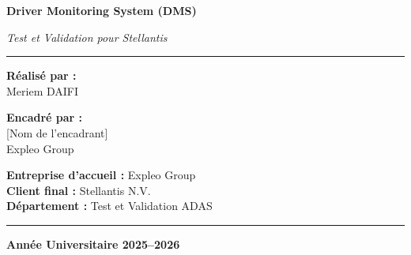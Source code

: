 \documentclass[12pt,a4paper,twoside]{report}
\begin{document}
\begin{titlepage}
\begin{center}
\vspace{0.3cm}

{\LARGE \textcolor{expleored}{\textbf{Driver Monitoring System (DMS)}}}

\vspace{0.3cm}

{\large \textit{Test et Validation pour Stellantis}}

\vspace{0.5cm}

\rule{0.8\textwidth}{0.5pt}

\vspace{1.2cm}

\begin{minipage}{0.45\textwidth}
\begin{flushleft}
{\large \textbf{Réalisé par :}}\\[0.3cm]
{\Large Meriem DAIFI}
\end{flushleft}
\end{minipage}
\hfill
\begin{minipage}{0.45\textwidth}
\begin{flushright}
{\large \textbf{Encadré par :}}\\[0.3cm]
{\Large [Nom de l'encadrant]}\\[0.2cm]
{\normalsize Expleo Group}
\end{flushright}
\end{minipage}

\vspace{1cm}

\begin{minipage}{0.9\textwidth}
\centering
{\large \textbf{Entreprise d'accueil :} Expleo Group}\\[0.2cm]
{\large \textbf{Client final :} Stellantis N.V.}\\[0.2cm]
{\large \textbf{Département :} Test et Validation ADAS}
\end{minipage}

\vspace{1.5cm}

\rule{\textwidth}{1.5pt}

\vspace{0.3cm}

{\Large \textbf{Année Universitaire 2025--2026}}

\end{center}
\end{titlepage}

\newpage
\thispagestyle{empty}
\mbox{}
\newpage
\end{document}
